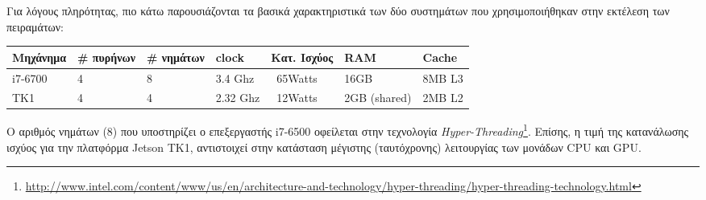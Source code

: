 

Για λόγους πληρότητας, πιο κάτω παρουσιάζονται τα βασικά χαρακτηριστικά
των δύο συστημάτων που χρησιμοποιήθηκαν στην εκτέλεση των πειραμάτων:
\begin{center}
\small
\begin{tabular}{ | l | l | l | l | l | l | l | }
  \hline
  \rowcolor{Gray}
  Μηχάνημα & \# πυρήνων & \# νημάτων & clock & Κατ. Ισχύος & RAM & Cache \\
  \hline
  i7-6700 & 4 & 8 & 3.4 Ghz & ~65Watts & 16GB & 8MΒ L3 \\
  \hline
  TK1 & 4 & 4 & 2.32 Ghz & ~12Watts & 2GB (shared) & 2MB L2 \\
  \hline
\end{tabular}
\end{center}

Ο αριθμός νημάτων (8) που υποστηρίζει ο επεξεργαστής i7-6500 οφείλεται στην
τεχνολογία \emph{Hyper-Threading}\footnote{\url{http://www.intel.com/content/www/us/en/architecture-and-technology/hyper-threading/hyper-threading-technology.html}}.
Επίσης, η τιμή της κατανάλωσης ισχύος για την
πλατφόρμα Jetson TK1, αντιστοιχεί στην κατάσταση μέγιστης (ταυτόχρονης) λειτουργίας των μονάδων
CPU και GPU.




\newpage

